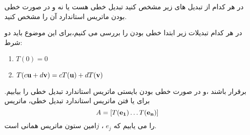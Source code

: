 \documentclass{article}
\begin{document}
در هر کدام از تبدیل های زیر مشخص کنید تبدیل خطی هست یا نه و در صورت خطی بودن ماتریس استاندارد آن را مشخص کنید.
\begin{حل}
در هر کدام تبدیلات زیر ابتدا خطی بودن را بررسی می کنیم،برای این موضوع باید دو شرط:
\begin{enumerate}
	\item $T(0)=0$
	\item $T(c{\bf u}+d{\bf v})=cT({\bf u})+dT({\bf v})$
\end{enumerate}

برقرار باشند ،و در صورت خطی بودن بایستی ماتریس استاندارد تبدیل خطی را بیابیم.
برای یا فتن ماتریس استاندارد تبدیل خطی، ماتریس
$$A= [T({\bf e_1}) \ldots T({\bf e_n})]$$
را می یابیم که 
$e_j$ 
،
$j$امین ستون ماتریس همانی است.
	
\end{حل}
\end{document}
